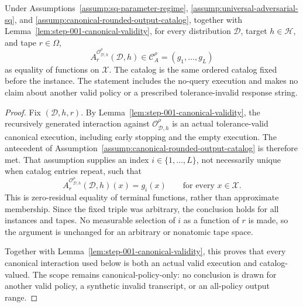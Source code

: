 \begin{proposition}
\label{prop:step-001-canonical-membership}
Under Assumptions~\ref{assump:sq-parameter-regime},
\ref{assump:universal-adversarial-sq}, and
\ref{assump:canonical-rounded-output-catalog}, together with
Lemma~\ref{lem:step-001-canonical-validity}, for every distribution
\(\mathcal D\), target \(h\in\mathcal H\), and tape \(r\in\Omega\),
\[
A_r^{\mathcal O^{\rho}_{\mathcal D,h}}(\mathcal D,h)
\in\mathcal C_A^{\rho}=(g_1,\ldots,g_L)
\]
as equality of functions on \(\mathcal X\).  The catalog is the same ordered
catalog fixed before the instance.  The statement includes the no-query
execution and makes no claim about another valid policy or a prescribed
tolerance-invalid response string.
\end{proposition}

\begin{proof}
Fix \((\mathcal D,h,r)\).  By
Lemma~\ref{lem:step-001-canonical-validity}, the recursively generated
interaction against \(\mathcal O^{\rho}_{\mathcal D,h}\) is an actual
tolerance-valid canonical execution, including early stopping and the empty
execution.  The antecedent of
Assumption~\ref{assump:canonical-rounded-output-catalog} is therefore met.
That assumption supplies an index \(i\in\{1,\ldots,L\}\), not necessarily
unique when catalog entries repeat, such that
\begin{equation}
A_r^{\mathcal O^{\rho}_{\mathcal D,h}}(\mathcal D,h)(x)=g_i(x)
\qquad\text{for every }x\in\mathcal X.
\label{eq:step-001-function-equality}
\end{equation}
This is zero-residual equality of terminal functions, rather than approximate
membership.  Since the fixed triple was arbitrary, the conclusion holds for
all instances and tapes.  No measurable selection of \(i\) as a function of
\(r\) is made, so the argument is unchanged for an arbitrary or nonatomic
tape space.

Together with Lemma~\ref{lem:step-001-canonical-validity}, this proves that
every canonical interaction used below is both an actual valid execution and
catalog-valued.  The scope remains canonical-policy-only: no conclusion is
drawn for another valid policy, a synthetic invalid transcript, or an
all-policy output range.
\end{proof}

